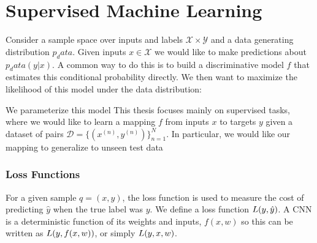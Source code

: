 \section{Supervised Machine Learning}
Consider a sample space over inputs and labels $\mathcal{X} \times \mathcal{Y}$
and a data generating distribution $p_data$. Given inputs $x \in \mathcal{X}$ we
would like to make predictions about $p_data(y|x)$. A common way to do this is
to build a discriminative model $f$ that estimates this conditional probability directly. 
We then want to maximize the likelihood of this model under the data
distribution:
\begin{equation}
\end{equation}

We parameterize this model
This thesis focuses mainly on supervised tasks, where we would like to learn a
mapping $f$ from inputs $x$ to targets $y$ given a dataset of pairs $\mathcal{D} = 
\{(x^{(n)}, y^{(n)})\}_{n=1}^N$. In particular, we would like our mapping to
generalize to unseen test data

\subsubsection{Loss Functions}
  For a given sample $q=(x, y)$, the loss
  function is used to measure the cost of predicting $\hat{y}$ when the
  true label was $y$. We define a loss function $L (y, \hat{y})$. 
  A CNN is a deterministic
  function of its weights and inputs, $f(x,w)$ so this can be written as $L
  (y, f(x,w))$, or simply $L(y, x, w)$.
  
